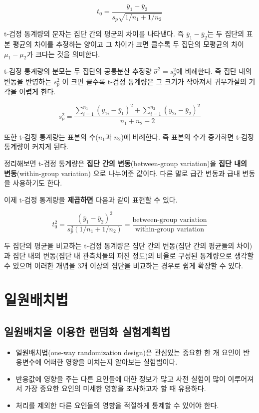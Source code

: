 \documentclass[
]{book}
\providecommand{\tightlist}{%
  \setlength{\itemsep}{0pt}\setlength{\parskip}{0pt}}
\begin{document}
\[ t_0 =\frac {\bar y_1 -\bar y_2 } { s_p \sqrt{1/n_1 + 1/n_2}} \]

t-검정 통계량의 분자는 집단 간의 평균의 차이를 나타낸다. 즉 \(\bar y_1 -\bar y_2\)는 두 집단의 표본 평균의 차이를 추정하는 양이고 그 차이가 크면 클수록 두 집단의 모평균의 차이 \(\mu_1 - \mu_2\)가 크다는 것을 의미한다.

t-검정 통계량의 분모는 두 집단의 공통분산 추정량 \(\hat \sigma^2 =s_p^2\)에 비례한다. 즉 집단 내의 변동을 반영하는 \(s_p^2\) 이 크면 클수록 t-검정 통계량은 그 크기가 작아져서 귀무가설의 기각을 어렵게 한다.

\[ s^2_p = \frac{\sum_{i=1}^{n_1} (y_{1i} -\bar y_1)^2 + \sum_{i=1}^{n_2} (y_{2i} -\bar y_2)^2}{n_1+n_2-2} \]

또한 t-검정 통계량는 표본의 수(\(n_1\)과 \(n_2\))에 비례한다. 즉 표본의 수가 증가햐면 t-검정 통계량이 커지게 된다.

정리해보면 t-검정 통계량은 \textbf{집단 간의 변동}(between-group variation)을 \textbf{집단 내의 변동}(within-group variation) 으로 나누어준 값이다. 다른 말로 급간 변동과 급내 변동을 사용하기도 한다.

이제 t-검정 통계량을 \textbf{제곱하면} 다음과 같이 표현할 수 있다.

\[  t_0^2 =\frac { (\bar y_1 -\bar y_2)^2 } { s_p^2 (1/n_1 + 1/n_2)} = \frac{\text{between-group variation}} {\text{within-group variation}} \]

두 집단의 평균을 비교하는 t-검정 통계량은 집단 간의 변동(집단 간의 평균들의 차이)과 집단 내의 변동(집단 내 관측치들의 퍼진 정도)의 비율로 구성된 통계량으로 생각할 수 있으며 이러한 개념을 3개 이상의 집단을 비교하는 경우로 쉽게 확장할 수 있다.

\hypertarget{oneway1}{%
\chapter{일원배치법}\label{oneway1}}

\hypertarget{uxc77cuxc6d0uxbc30uxce58uxc744-uxc774uxc6a9uxd55c-uxb79cuxb364uxd654-uxc2e4uxd5d8uxacc4uxd68duxbc95}{%
\section{일원배치을 이용한 랜덤화 실험계획법}\label{uxc77cuxc6d0uxbc30uxce58uxc744-uxc774uxc6a9uxd55c-uxb79cuxb364uxd654-uxc2e4uxd5d8uxacc4uxd68duxbc95}}

\begin{itemize}
\tightlist
\item
  일원배치법(one-way randomization design)은 관심있는 중요한 한 개 요인이 반응변수에 어떠한 영향을 미치는지 알아보는 실험법이다.
\item
  반응값에 영향을 주는 다른 요인들에 대한 정보가 많고 사전 실험이 많이 이루어져서 가장 중요한 요인의 미세한 영향을 조사하고자 할 때 유용하다.
\item
  처리를 제외한 다른 요인들의 영향을 적절하게 통제할 수 있어야 한다.
\end{itemize}
\end{document}
